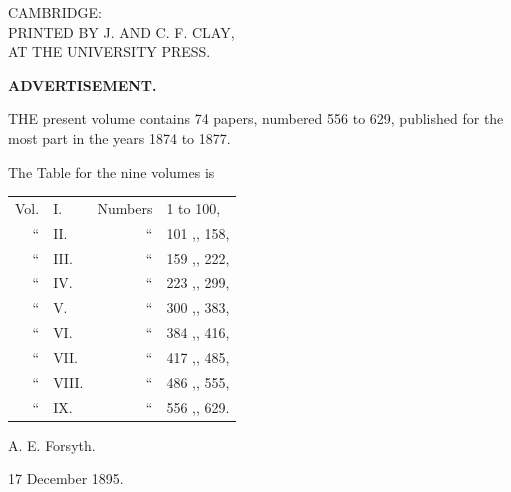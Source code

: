 \documentclass[11pt,a4paper]{book}
\begin{document}
\begin{center}
\vfill
\newpage

\vspace*{6cm}

{\large CAMBRIDGE:}\\[6pt]
PRINTED BY J. AND C. F. CLAY,\\
AT THE UNIVERSITY PRESS.

\end{center}


\newpage
\thispagestyle{empty}

\begin{center}
{\large \textbf{ADVERTISEMENT.}}
\end{center}

\vspace{12pt}

\noindent THE present volume contains 74 papers, numbered 556 to 629, published for the most part in the years 1874 to 1877.

\vspace{12pt}

\noindent The Table for the nine volumes is

\begin{center}
\begin{tabular}{r @{~} l @{~} r @{~} l}
Vol. & I. & Numbers & 1 to 100,\\ 
`` & II. & `` & 101 ,, 158,\\ 
`` & III. & `` & 159 ,, 222,\\ 
`` & IV. & `` & 223 ,, 299,\\ 
`` & V. & `` & 300 ,, 383,\\ 
`` & VI. & `` & 384 ,, 416,\\ 
`` & VII. & `` & 417 ,, 485,\\ 
`` & VIII. & `` & 486 ,, 555,\\ 
`` & IX. & `` & 556 ,, 629.\\ 
\end{tabular}
\end{center}

\vspace{12pt}

\hfill A. E. Forsyth.

\hfill 17 December 1895.

\end{document}
